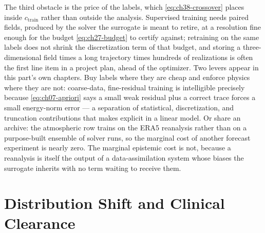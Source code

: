 The third obstacle is the price of the labels, which \eqref{eq:ch38-crossover} places inside
$c_{\mathrm{train}}$ rather than outside the analysis. Supervised training needs paired fields, produced by the solver the
surrogate is meant to retire, at a resolution fine enough for the budget
\eqref{eq:ch27-budget} to certify against; retraining on the same labels does not shrink the
discretization term of that budget, and storing a three-dimensional field times a long
trajectory times hundreds of realizations is often the first line item in a project plan,
ahead of the optimizer. Two levers appear in this part's own chapters. Buy labels where they
are cheap and enforce physics where they are not: coarse-data, fine-residual training
\cite{li2021physics} is intelligible precisely because \eqref{eq:ch07-apriori} says a small
weak residual plus a correct trace forces a small energy-norm error --- a separation of
statistical, discretization, and truncation contributions that \cite{subedi2024controlling}
makes explicit in a linear model. Or share an archive: the atmospheric row trains on the ERA5
reanalysis rather than on a purpose-built ensemble of solver runs, so the marginal cost of
another forecast experiment is nearly zero. The marginal epistemic cost is not, because a
reanalysis is itself the output of a data-assimilation system whose biases the surrogate
inherits with no term waiting to receive
them.

\section{Distribution Shift and Clinical Clearance}
\label{sec:ch38-data-shift}

